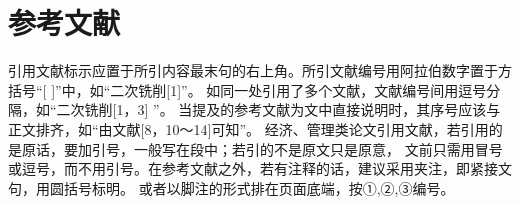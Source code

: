 \documentclass{jnuthesis}
\begin{document}
\chapter*{参考文献}

引用文献标示应置于所引内容最末句的右上角。所引文献编号用阿拉伯数字置于方括号“[ ]”中，如“二次铣削[1]”。
如同一处引用了多个文献，文献编号间用逗号分隔，如“二次铣削[1，3] ”。
当提及的参考文献为文中直接说明时，其序号应该与正文排齐，如“由文献[8，10～14]可知”。
经济、管理类论文引用文献，若引用的是原话，要加引号，一般写在段中；若引的不是原文只是原意，
文前只需用冒号或逗号，而不用引号。在参考文献之外，若有注释的话，建议采用夹注，即紧接文句，用圆括号标明。
或者以脚注的形式排在页面底端，按①,②,③编号。
\end{document}
